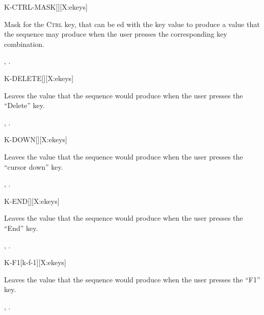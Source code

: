 \begin{worddef}{}{K-CTRL-MASK}[][X:ekeys]
\item {}

	Mask for the \textsc{Ctrl} key, that can be ed with the
	key value to produce a value that the sequence 
	 may produce when the user presses the
	corresponding key combination.

\see {},
	.
\end{worddef}


\begin{worddef}{}{K-DELETE}[][X:ekeys]
\item {}

	Leaves the value  that the sequence 
	 would produce when the user presses the
	``Delete'' key.

\see {},
	.
\end{worddef}


\begin{worddef}{}{K-DOWN}[][X:ekeys]
\item {}

	Leaves the value  that the sequence 
	 would produce when the user presses the
	``cursor down'' key.

\see {},
	.
\end{worddef}


\begin{worddef}{}{K-END}[][X:ekeys]
\item {}

	Leaves the value  that the sequence 
	 would produce when the user presses the
	``End'' key.

\see {},
	.
\end{worddef}


\begin{worddef}{}{K-F1}[k-f-1][X:ekeys]
\item {}

	Leaves the value  that the sequence 
	 would produce when the user presses the
	``F1'' key.

\see {},
	.
\end{worddef}


